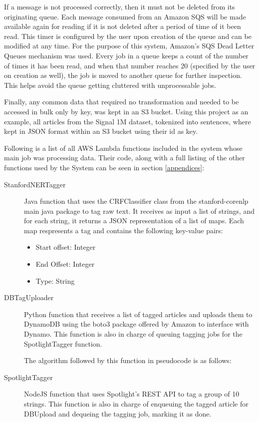 If a message is not processed correctly, then it must not be deleted from its originating queue.
Each message consumed from an Amazon SQS will be made available again for reading if it is not deleted after a period of time of it been read.
This timer is configured by the user upon creation of the queue and can be modified at any time.
For the purpose of this system, Amazon's SQS Dead Letter Queues mechanism was used.
Every job in a queue keeps a count of the number of times it has been read, and when that number reaches $20$ (specified by the user on creation as well), the job is moved to another queue for further inspection. This helps avoid the queue getting cluttered with unprocessable jobs. 

Finally, any common data that required no transformation and needed to be accessed in bulk only by key, was kept in an S3 bucket.
Using this project as an example, all articles from the Signal 1M dataset, tokenized into sentences,
where kept in JSON format within an S3 bucket using their id as key.

Following is a list of all AWS Lambda functions included in the system whose main job was processing data.
Their code, along with a full listing of the other functions used by the System
can be seen in section \ref{appendices}:
\begin{description}
\item[StanfordNERTagger]
Java function that uses the CRFClassifier class from the stanford-corenlp main java package to tag raw text.
It receives as input a list of strings, and for each string, it returns a JSON representation of a list of maps.
Each map respresents a tag and contains the following key-value pairs:
\begin{itemize}
  \item Start offset: Integer
  \item End Offset: Integer
  \item Type: String
\end{itemize}

\item[DBTagUploader]
Python function that receives a list of tagged articles and uploads them to DynamoDB using the boto3 package
offered by Amazon to interface with Dynamo.
This function is also in charge of queuing tagging jobs for the SpotlightTagger function.

The algorithm followed by this function in pseudocode is as follows:



\item[SpotlightTagger]
NodeJS function that uses Spotlight's REST API to tag a group of 10 strings.
This function is also in charge of enqueuing the tagged article for DBUpload and dequeing the tagging job,
marking it as done.

\end{description}

